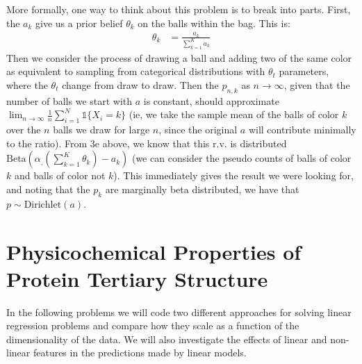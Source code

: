 \documentclass[submit]{harvardml}
\theoremstyle{plain}
\begin{document}
\begin{enumerate}[label=(\alph*)]
More formally, one way to think about this problem is to break into parts. First, the $a_k$ give us a prior belief $\theta_k$ on the balls within the bag. This is:
\begin{align*}
\theta_k &= \frac{a_k}{\sum_{k=1}^K a_k}
\end{align*}
Then we consider the process of drawing a ball and adding two of the same color as equivalent to sampling from categorical distributions with $\theta_t$ parameters, where the $\theta_t$ change from draw to draw. Then the $p_{n,k}$ as $n \to \infty$, given that the number of balls we start with $a$ is constant, should approximate $\lim_{n\to \infty} \frac{1}{n} \sum_{i=1}^{N} \mathbb{1}\{X_i = k\}$ (ie, we take the sample mean of the balls of color $k$ over the $n$ balls we draw for large $n$, since the original $a$ will contribute minimally to the ratio). From 3e above, we know that this r.v. is distributed $\text{Beta}(\alpha_, \left(\sum_{k=1}^K\theta_k\right) - a_k)$ (we can consider the pseudo counts of balls of color $k$ and balls of color not $k$). This immediately gives the result we were looking for, and noting that the $p_{k}$ are marginally beta distributed, we have that $p \sim \text{Dirichlet}(a)$.
\end{enumerate}

\section*{Physicochemical Properties of Protein Tertiary Structure}

In the following problems we will code two different approaches for
solving linear regression problems and compare how they scale as a function of
the dimensionality of the data.  We will also investigate the effects of
linear and non-linear features in the predictions made by linear models.
\end{document}
